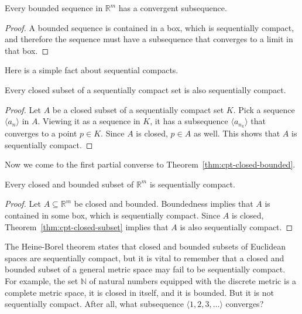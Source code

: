 \begin{thm}
  \label{thm:bw}
  Every bounded sequence in $\mathbb{R}^m$ has a convergent subsequence.
\end{thm}

\begin{proof}
  A bounded sequence is contained in a box, which is sequentially compact, and therefore the sequence must have a subsequence that converges to a limit in that box. 
\end{proof}

Here is a simple fact about sequential compacts.
\begin{thm}
  \label{thm:cpt-closed-subset}
  Every closed subset of a sequentially compact set is also sequentially compact.
\end{thm}

\begin{proof}
  Let $A$ be a closed subset of a sequentially compact set $K$.
  Pick a sequence $\langle a_n \rangle$ in $A$.
  Viewing it as a sequence in $K$, it has a subsequence $\langle a_{n_k} \rangle$ that converges to a point $p \in K$. 
  Since $A$ is closed, $p \in A$ as well.
  This shows that $A$ is sequentially compact.
\end{proof}

Now we come to the first partial converse to Theorem~\ref{thm:cpt-closed-bounded}.

\begin{thm}
  Every closed and bounded subset of $\mathbb{R}^m$ is sequentially compact.
\end{thm}

\begin{proof}
  Let $A \subseteq \mathbb{R}^m$ be closed and bounded.
  Boundedness implies that $A$ is contained in some box, which is sequentially compact.
  Since $A$ is closed, Theorem~\ref{thm:cpt-closed-subset} implies that $A$ is also sequentially compact.
\end{proof}

The Heine-Borel theorem states that closed and bounded subsets of Euclidean spaces are sequentially compact, but it is vital to remember that a closed and bounded subset of a general metric space may fail to be sequentially compact.
For example, the set $\mathbb{N}$ of natural numbers equipped with the discrete metric is a complete metric space, it is closed in itself, and it is bounded.
But it is not sequentially compact.
After all, what subsequence $\langle 1, 2, 3, \dots \rangle$ converges?

